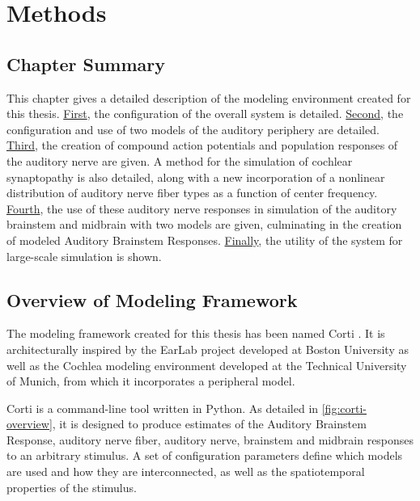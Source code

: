 \chapter{Methods}
\label{chapter:Methods}
\thispagestyle{myheadings}

\graphicspath{{4_Methods/Figures/}}

\section{Chapter Summary} %
\label{sec:methodsummary}
This chapter gives a detailed description of the modeling environment created for this thesis.  \hyperref[sec:overview_of_modeling_framework]{First}, the configuration of the overall system is detailed.  \hyperref[sec:peripheral_models]{Second}, the configuration and use of two models of the auditory periphery are detailed.  \hyperref[sec:auditory_nerve_response_models]{Third}, the creation of compound action potentials and population responses of the auditory nerve are given.  A method for the simulation of cochlear synaptopathy is also detailed, along with a new incorporation of a nonlinear distribution of auditory nerve fiber types as a function of center frequency.  \hyperref[sec:brainstem_models]{Fourth}, the use of these auditory nerve responses in simulation of the auditory brainstem and midbrain with two models are given, culminating in the creation of modeled Auditory Brainstem Responses.  \hyperref[sec:automated_parameter_exploration]{Finally}, the utility of the system for large-scale simulation is shown. 


\section{Overview of Modeling Framework} %
\label{sec:overview_of_modeling_framework}
The modeling framework created for this thesis has been named Corti \citep{Voysey2016Corti}. It is architecturally inspired by the EarLab project developed at Boston University as well as the Cochlea \citep{Rudnicki2014Cochlea} modeling environment developed at the Technical University of Munich, from which it incorporates a peripheral model.

Corti is a command-line tool written in Python. As detailed in \autoref{fig:corti-overview}, it is designed to produce estimates of the Auditory Brainstem Response, auditory nerve fiber, auditory nerve, brainstem and midbrain responses to an arbitrary stimulus.  A set of configuration parameters define which models are used and how they are interconnected, as well as the spatiotemporal properties of the stimulus.

